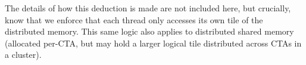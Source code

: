 \filbreak
The details of how this deduction is made are not included here, but crucially, know that we enforce that each thread only accesses its own tile of the distributed memory.
This same logic also applies to distributed shared memory (allocated per-CTA, but may hold a larger logical tile distributed across CTAs in a cluster).

\filbreak
{}

\filbreak
{}


